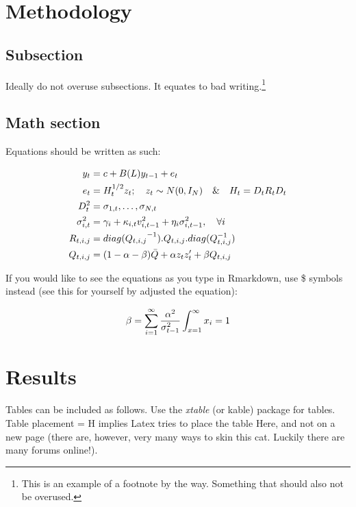 \documentclass[11pt,preprint, authoryear]{elsarticle}
\numberwithin{equation}{section}
\numberwithin{figure}{section}
\numberwithin{table}{section}
\let\rmarkdownfootnote\footnote%
\def\footnote{\protect\rmarkdownfootnote}
\begin{document}
\section{Methodology}\label{methodology}

\subsection{Subsection}\label{subsection}

Ideally do not overuse subsections. It equates to bad writing.\footnote{This
  is an example of a footnote by the way. Something that should also not
  be overused.}

\subsection{Math section}\label{math-section}

Equations should be written as such:

\begin{align} 
    y_t &= c + B(L) y_{t-1} + e_t   \label{eq2}    \\ \notag 
    e_t &= H_t^{1/2}  z_t ; \quad z_t \sim  N(0,I_N) \quad \& \quad H_t = D_tR_tD_t \\ \notag
        D_t^2 &= {\sigma_{1,t}, \dots, \sigma_{N,t}}   \\ \notag
        \sigma_{i,t}^2 &= \gamma_i+\kappa_{i,t}  v_{i, t-1}^2 +\eta_i  \sigma_{i, t-1}^2, \quad \forall i \\ \notag
        R_{t, i, j} &= {diag(Q_{t, i, j}}^{-1}) . Q_{t, i, j} . diag(Q_{t, i, j}^{-1})  \\ \notag
        Q_{t, i, j} &= (1-\alpha-\beta)  \bar{Q} + \alpha  z_t  z_t'  + \beta  Q_{t, i, j} \notag
\end{align}

If you would like to see the equations as you type in Rmarkdown, use \$
symbols instead (see this for yourself by adjusted the equation):

\[
\beta = \sum_{i = 1}^{\infty}\frac{\alpha^2}{\sigma_{t-1}^2} \\ 
\int_{x = 1}^{\infty}x_{i} = 1
\]

\section{Results}\label{results}

Tables can be included as follows. Use the \emph{xtable} (or kable)
package for tables. Table placement = H implies Latex tries to place the
table Here, and not on a new page (there are, however, very many ways to
skin this cat. Luckily there are many forums online!).
\end{document}
